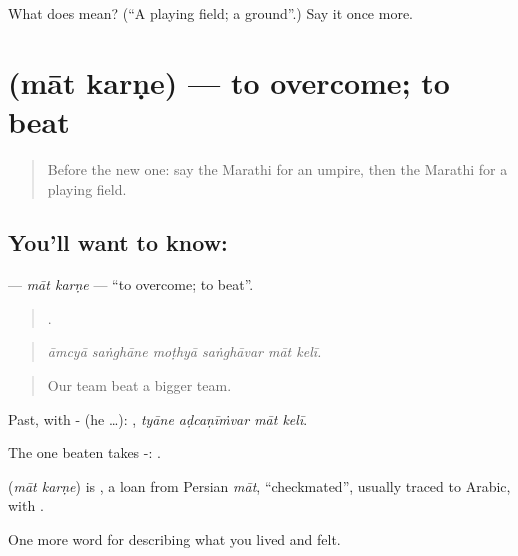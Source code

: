 \begin{tcolorbox}[breakable,colback=teal!4,colframe=teal!35!black,title={Before you move on}]
What does  mean? (\textquotedblleft{}A playing field; a ground\textquotedblright{}.) Say it once more.
\end{tcolorbox}
\section[\texorpdfstring{\mr{मात} \mr{करणे} (māt karṇe)}{मात करणे (māt karṇe)}]{  (māt karṇe) — to overcome; to beat}

\label{lesson:MR-C529-mat-karne}



\begin{quote}
Before the new one: say the Marathi for an umpire, then the Marathi for a playing field.
\end{quote}

\subsection*{You'll want to know:  }
\textbf{ } — \emph{māt karṇe} — \textquotedblleft{}to overcome; to beat\textquotedblright{}.

\begin{quote}
     .
\end{quote}

\begin{quote}
\emph{āmcyā saṅghāne moṭhyā saṅghāvar māt kelī.}
\end{quote}

\begin{quote}
Our team beat a bigger team.
\end{quote}

Past, with - (he …):    , \emph{tyāne aḍcaṇīṁvar māt kelī}.

The one beaten takes -:   .

\begin{cousinweb}
\textbf{ } (\emph{māt karṇe}) is , a loan from Persian \emph{māt}, \textquotedblleft{}checkmated\textquotedblright{}, usually traced to Arabic, with .
\end{cousinweb}

\begin{grammarlens}[title={What you've built}]
One more word for describing what you lived and felt.
\end{grammarlens}

